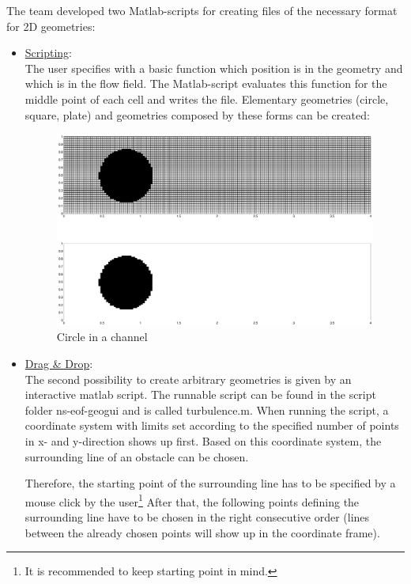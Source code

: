 \noii The team developed two Matlab-scripts for creating files of the necessary format for 2D geometries:
\begin{itemize}
\item \underline{Scripting}:\\
The user specifies with a basic function which position is in the geometry and which is in the flow field. The Matlab-script evaluates this function for the middle point of each cell and writes the file. Elementary geometries (circle, square, plate) and geometries composed by these forms can be created:

\begin{figure}[!htb]
\centering
\includegraphics[scale=.3]{FIGURES/circle.eps}
\caption{Circle in a channel}
\label{fig:circle_in_channel}
\end{figure} 

\item \underline{Drag \& Drop}:\\
The second possibility to create arbitrary geometries is given by an interactive matlab script. The runnable script can be found in the script folder ns-eof-geogui and is called turbulence.m.
When running the script, a coordinate system with limits set according to the specified number of points in x- and y-direction shows up first. Based on this coordinate system, the surrounding line of an obstacle can be chosen.

Therefore, the starting point of the surrounding line has to be specified by a mouse click by the user\footnote{ It is recommended to keep starting point in mind.}
After that, the following points defining the surrounding line have to be chosen in the right consecutive order (lines between the already chosen points will show up in the coordinate frame).


\end{itemize}
